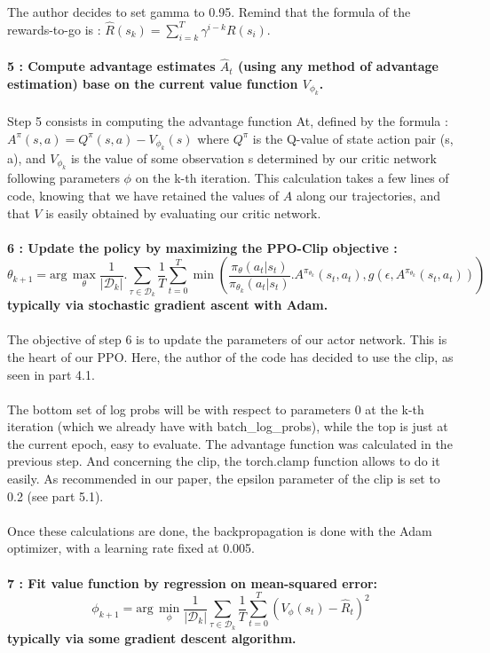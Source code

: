 \documentclass{article}
\begin{document}
The author decides to set gamma to 0.95. Remind that the formula of the rewards-to-go is : $\hat{R}(s_k) = \sum_{i=k}^T \gamma^{i-k} R(s_i)$.
\\ \\
\textbf{5 : Compute advantage estimates $\hat{A}_t$ (using any method of advantage estimation) base on the current value function $V_{\phi_k}$.}
\\ \\
Step 5 consists in computing the advantage function At, defined by the formula : $A^{\pi}(s,a) = Q^{\pi}(s,a) - V_{\phi_k}(s)$
where $Q^{\pi}$ is the Q-value of state action pair (s, a), and $V_{\phi_k}$ is the value of some observation s determined by our critic network following parameters $\phi$ on the k-th iteration. This calculation takes a few lines of code, knowing that we have retained the values of $A$ along our trajectories, and that $V$ is easily obtained by evaluating our critic network.
\\ \\
\textbf{6 : Update the policy by maximizing the PPO-Clip objective :
$$
\theta_{k+1} = \text{arg}\, \max_{\theta} \frac{1}{|\mathcal{D}_k|}.\sum_{\tau\in\mathcal{D}_k}\frac{1}{T} \sum_{t=0}^{T}\min(\frac{\pi_{\theta}(a_t |s_t)}{\pi_{\theta_k}(a_t |s_t)} .A^{\pi_{\theta_k}}(s_t, a_t), g(\epsilon, A^{\pi_{\theta_k}}(s_t, a_t)))
$$
typically via stochastic gradient ascent with Adam.}
\\ \\
The objective of step 6 is to update the parameters of our actor network. This is the heart of our PPO. Here, the author of the code has decided to use the clip, as seen in part 4.1.
\\ \\ 
The bottom set of log probs will be with respect to parameters 0 at the k-th iteration (which we already have with batch\_log\_probs), while the top is just at the current epoch, easy to evaluate. The advantage function was calculated in the previous step. And concerning the clip, the torch.clamp function allows to do it easily. As recommended in our paper, the epsilon parameter of the clip is set to 0.2 (see part 5.1). \\ \\
Once these calculations are done, the backpropagation is done with the Adam optimizer, with a learning rate fixed at 0.005. 
\\ \\
\textbf{7 : Fit value function by regression on mean-squared error:
$$
\phi_{k+1} = \text{arg}\, \min_{\phi} \frac{1}{|\mathcal{D}_k|}\sum_{\tau\in\mathcal{D}_k}\frac{1}{T}\sum_{t=0}^{T}(V_\phi(s_t)-\hat{R}_t)^2
$$
typically via some gradient descent algorithm.}
\end{document}
